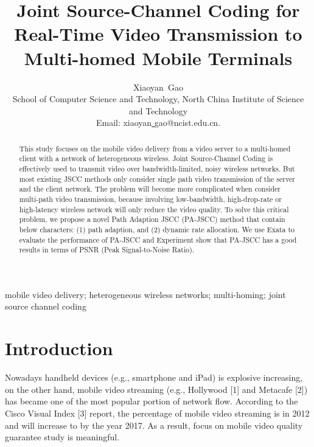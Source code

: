 \documentclass[journal]{IEEEtran}
\begin{document}
\title{Joint Source-Channel Coding for Real-Time Video Transmission to Multi-homed Mobile Terminals}


\author{Xiaoyan~Gao\\
School of Computer Science and Technology, North China Institute of Science and Technology\\
Email:  xiaoyan\underline{ }gao@ncist.edu.cn.


}















\maketitle


\begin{abstract}
This study focuses on the mobile video delivery from a video server to a multi-homed client with a network of heterogeneous wireless. Joint Source-Channel Coding is effectively used to transmit video over bandwidth-limited, noisy wireless networks. But most existing JSCC methods only consider single path video transmission of the server and the client network. The problem will become more complicated when consider multi-path video transmission, because involving low-bandwidth, high-drop-rate or high-latency wireless network will only reduce the video quality. To solve this critical problem, we propose a novel Path Adaption JSCC (PA-JSCC) method that contain below characters: (1) path adaption, and (2) dynamic rate allocation. We use Exata to evaluate the performance of PA-JSCC and Experiment show that PA-JSCC has a good results in terms of PSNR (Peak Signal-to-Noise Ratio).

\end{abstract}
\begin{keywords}
mobile video delivery; heterogeneous wireless networks; multi-homing; joint source channel coding
\end{keywords}







\IEEEpeerreviewmaketitle



\section{Introduction}
Nowadays handheld devices (e.g., smartphone and iPad) is explosive increasing, on the other hand,  mobile video streaming (e.g., Hollywood [1] and Metacafe [2]) has became one of the most popular portion of network flow. According to the Cisco Visual Index [3] report, the percentage of mobile video streaming is  in 2012 and will increase to  by the year 2017. As a result, focus on mobile video quality guarantee study is meaningful.
\end{document}
